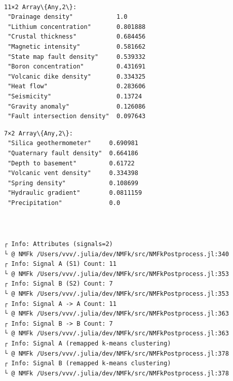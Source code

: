\documentclass[11pt]{article}
\begin{document}
    \begin{Verbatim}[commandchars=\\\{\}]

    \end{Verbatim}

    \begin{center}
    \end{center}
    { \hspace*{\fill} \\}
    
    
    \begin{Verbatim}[commandchars=\\\{\}]
11×2 Array\{Any,2\}:
 "Drainage density"            1.0
 "Lithium concentration"       0.801888
 "Crustal thickness"           0.684456
 "Magnetic intensity"          0.581662
 "State map fault density"     0.539332
 "Boron concentration"         0.431691
 "Volcanic dike density"       0.334325
 "Heat flow"                   0.283606
 "Seismicity"                  0.13724
 "Gravity anomaly"             0.126086
 "Fault intersection density"  0.097643
    \end{Verbatim}

    
    
    \begin{Verbatim}[commandchars=\\\{\}]
7×2 Array\{Any,2\}:
 "Silica geothermometer"     0.690981
 "Quaternary fault density"  0.664186
 "Depth to basement"         0.61722
 "Volcanic vent density"     0.334398
 "Spring density"            0.108699
 "Hydraulic gradient"        0.0811159
 "Precipitation"             0.0
    \end{Verbatim}

    
    \begin{center}
    \end{center}
    { \hspace*{\fill} \\}
    
    \begin{Verbatim}[commandchars=\\\{\}]

    \end{Verbatim}

    \begin{Verbatim}[commandchars=\\\{\}]
┌ Info: Attributes (signals=2)
└ @ NMFk /Users/vvv/.julia/dev/NMFk/src/NMFkPostprocess.jl:340
┌ Info: Signal A (S1) Count: 11
└ @ NMFk /Users/vvv/.julia/dev/NMFk/src/NMFkPostprocess.jl:353
┌ Info: Signal B (S2) Count: 7
└ @ NMFk /Users/vvv/.julia/dev/NMFk/src/NMFkPostprocess.jl:353
┌ Info: Signal A -> A Count: 11
└ @ NMFk /Users/vvv/.julia/dev/NMFk/src/NMFkPostprocess.jl:363
┌ Info: Signal B -> B Count: 7
└ @ NMFk /Users/vvv/.julia/dev/NMFk/src/NMFkPostprocess.jl:363
┌ Info: Signal A (remapped k-means clustering)
└ @ NMFk /Users/vvv/.julia/dev/NMFk/src/NMFkPostprocess.jl:378
┌ Info: Signal B (remapped k-means clustering)
└ @ NMFk /Users/vvv/.julia/dev/NMFk/src/NMFkPostprocess.jl:378
    \end{Verbatim}
\end{document}
